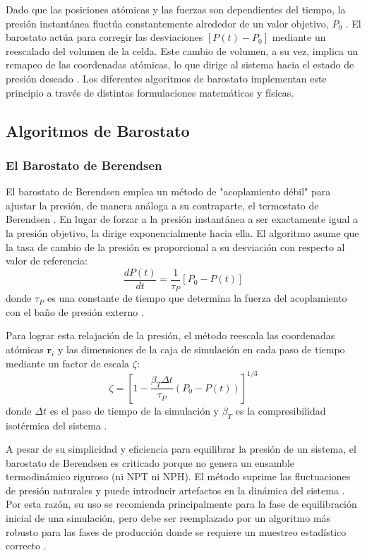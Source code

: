 Dado que las posiciones atómicas y las fuerzas son dependientes del tiempo, la presión instantánea fluctúa constantemente alrededor de un valor objetivo, $P_0$ \cite[113]{zhou2022molecular}. El barostato actúa para corregir las desviaciones $[P(t) - P_0]$ mediante un reescalado del volumen de la celda. Este cambio de volumen, a su vez, implica un remapeo de las coordenadas atómicas, lo que dirige al sistema hacia el estado de presión deseado \cite[113]{zhou2022molecular}. Los diferentes algoritmos de barostato implementan este principio a través de distintas formulaciones matemáticas y físicas.

\subsection{Algoritmos de Barostato}

\subsubsection{El Barostato de Berendsen}
El barostato de Berendsen emplea un método de "acoplamiento débil" para ajustar la presión, de manera análoga a su contraparte, el termostato de Berendsen \cite[102, 113]{zhou2022molecular}. En lugar de forzar a la presión instantánea a ser exactamente igual a la presión objetivo, la dirige exponencialmente hacia ella. El algoritmo asume que la tasa de cambio de la presión es proporcional a su desviación con respecto al valor de referencia:
$$
\frac{dP(t)}{dt} = \frac{1}{\tau_P} [P_0 - P(t)]
$$
donde $\tau_P$ es una constante de tiempo que determina la fuerza del acoplamiento con el baño de presión externo \cite[114]{zhou2022molecular}.

Para lograr esta relajación de la presión, el método reescala las coordenadas atómicas $\mathbf{r}_i$ y las dimensiones de la caja de simulación en cada paso de tiempo mediante un factor de escala $\zeta$:
$$
\zeta = \left[ 1 - \frac{\beta_T \Delta t}{\tau_P} (P_0 - P(t)) \right]^{1/3}
$$
donde $\Delta t$ es el paso de tiempo de la simulación y $\beta_T$ es la compresibilidad isotérmica del sistema \cite[114]{zhou2022molecular}.

A pesar de su simplicidad y eficiencia para equilibrar la presión de un sistema, el barostato de Berendsen es criticado porque no genera un ensamble termodinámico riguroso (ni NPT ni NPH). El método suprime las fluctuaciones de presión naturales y puede introducir artefactos en la dinámica del sistema \cite[113, 115]{zhou2022molecular}. Por esta razón, su uso se recomienda principalmente para la fase de equilibración inicial de una simulación, pero debe ser reemplazado por un algoritmo más robusto para las fases de producción donde se requiere un muestreo estadístico correcto \cite[115]{zhou2022molecular}.

